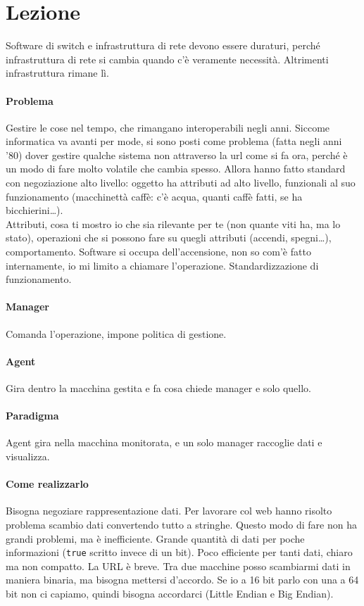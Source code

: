 \documentclass[10pt]{book}
\begin{document}
\section{Lezione}
Software di switch e infrastruttura di rete devono essere duraturi, perché infrastruttura di rete si cambia quando c'è veramente necessità. Altrimenti infrastruttura rimane lì. 
\paragraph{Problema} Gestire le cose nel tempo, che rimangano interoperabili negli anni. Siccome informatica va avanti per mode, si sono posti come problema (fatta negli anni '80) dover gestire qualche sistema non attraverso la url come si fa ora, perché è un modo di fare molto volatile che cambia spesso. Allora hanno fatto standard con negoziazione alto livello: oggetto ha attributi ad alto livello, funzionali al suo funzionamento (macchinettà caffè: c'è acqua, quanti caffè fatti, se ha bicchierini\ldots).\\
Attributi, cosa ti mostro io che sia rilevante per te (non quante viti ha, ma lo stato), operazioni che si possono fare su quegli attributi (accendi, spegni\ldots), comportamento. Software si occupa dell'accensione, non so com'è fatto internamente, io mi limito a chiamare l'operazione. Standardizzazione di funzionamento.
\paragraph{Manager} Comanda l'operazione, impone politica di gestione.
\paragraph{Agent} Gira dentro la macchina gestita e fa cosa chiede manager e solo quello.
\paragraph{Paradigma} Agent gira nella macchina monitorata, e un solo manager raccoglie dati e visualizza.
\paragraph{Come realizzarlo} Bisogna negoziare rappresentazione dati. Per lavorare col web hanno risolto problema scambio dati convertendo tutto a stringhe. Questo modo di fare non ha grandi problemi, ma è inefficiente. Grande quantità di dati per poche informazioni (\texttt{true} scritto invece di un bit). Poco efficiente per tanti dati, chiaro ma non compatto. La URL è breve. Tra due macchine posso scambiarmi dati in maniera binaria, ma bisogna mettersi d'accordo. Se io a 16 bit parlo con una a 64 bit non ci capiamo, quindi bisogna accordarci (Little Endian e Big Endian).
\end{document}

